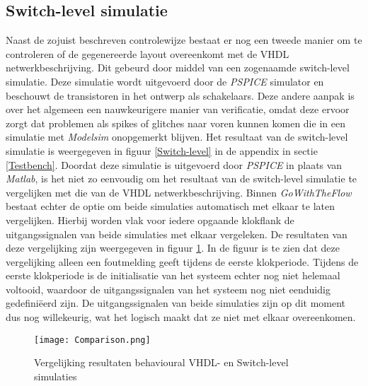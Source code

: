 \documentclass[11pt,twoside,a4paper]{article}
\begin{document}
\subsection{Switch-level simulatie}
Naast de zojuist beschreven controlewijze bestaat er nog een tweede manier om te controleren of de gegenereerde layout overeenkomt met de VHDL netwerkbeschrijving. Dit gebeurd door middel van een zogenaamde switch-level simulatie. Deze simulatie wordt uitgevoerd door de \emph{PSPICE} simulator en beschouwt de transistoren in het ontwerp als schakelaars. Deze andere aanpak is over het algemeen een nauwkeurigere manier van verificatie, omdat deze ervoor zorgt dat problemen als spikes of glitches naar voren kunnen komen die in een simulatie met \emph{Modelsim} onopgemerkt blijven. Het resultaat van de switch-level simulatie is weergegeven in figuur \ref{Switch-level} in de appendix in sectie \ref{Testbench}. Doordat deze simulatie is uitgevoerd door \emph{PSPICE} in plaats van \emph{Matlab}, is het niet zo eenvoudig om het resultaat van de switch-level simulatie te vergelijken met die van de VHDL netwerkbeschrijving. Binnen \emph{GoWithTheFlow} bestaat echter de optie om beide simulaties automatisch met elkaar te laten vergelijken. Hierbij worden vlak voor iedere opgaande klokflank de uitgangssignalen van beide simulaties met elkaar vergeleken. De resultaten van deze vergelijking zijn weergegeven in figuur \ref{Vergelijking}. In de figuur is te zien dat deze vergelijking alleen een foutmelding geeft tijdens de eerste klokperiode. Tijdens de eerste klokperiode is de initialisatie van het systeem echter nog niet helemaal voltooid, waardoor de uitgangssignalen van het systeem nog niet eenduidig gedefiniëerd zijn. De uitgangssignalen van beide simulaties zijn op dit moment dus nog willekeurig, wat het logisch maakt dat ze niet met elkaar overeenkomen.
\begin{figure}[H]
\begin{center}
\texttt{[image: Comparison.png]}
\caption{Vergelijking resultaten behavioural VHDL- en Switch-level simulaties}
\label{Vergelijking}
\end{center}
\end{figure}

\newpage
\end{document}

